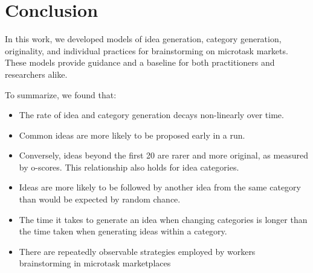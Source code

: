 


\section{Conclusion}

In this work, we developed models of idea generation, category generation, originality, and individual practices for brainstorming on microtask markets. These models provide guidance and a baseline for both practitioners and researchers alike.

To summarize, we found that:

\begin{itemize}
\item The rate of idea and category generation decays non-linearly over time. 
\item Common ideas are more likely to be proposed early in a run. 
\item Conversely, ideas beyond the first 20 are rarer and more original, as measured by o-scores. This relationship also holds for idea categories.
\item Ideas are more likely to be followed by another idea from the same category than would be expected by random chance.
\item The time it takes to generate an idea when changing categories is longer than the time taken when generating ideas within a category.
\item There are repeatedly observable strategies employed by workers brainstorming in microtask marketplaces
\end{itemize}

